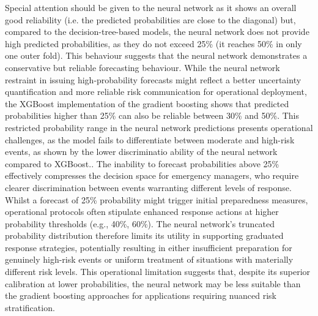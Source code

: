 Special attention should be given to the neural network as it shows an overall good reliability (i.e. the predicted probabilities are close to the diagonal) but,  compared to the decision-tree-based models, the neural network does not provide high predicted probabilities, as they do not exceed 25\% (it reaches 50\% in only one outer fold). This behaviour suggests that the neural network demonstrates a conservative but reliable forecasting behaviour. While the neural network restraint in issuing high-probability forecasts might reflect a better uncertainty quantification and more reliable risk communication for operational deployment, the XGBoost implementation of the gradient boosting shows that predicted probabilities higher than 25\% can also be reliable between 30\% and 50\%. This restricted probability range in the neural network predictions presents operational challenges, as the model fails to differentiate between moderate and high-risk events, as shown by the lower discriminatio ability of the neural network compared to XGBoost.. The inability to forecast probabilities above 25\% effectively compresses the decision space for emergency managers, who require clearer discrimination between events warranting different levels of response. Whilst a forecast of 25\% probability might trigger initial preparedness measures, operational protocols often stipulate enhanced response actions at higher probability thresholds (e.g., 40\%, 60\%). The neural network's truncated probability distribution therefore limits its utility in supporting graduated response strategies, potentially resulting in either insufficient preparation for genuinely high-risk events or uniform treatment of situations with materially different risk levels. This operational limitation suggests that, despite its superior calibration at lower probabilities, the neural network may be less suitable than the gradient boosting approaches for applications requiring nuanced risk stratification.

